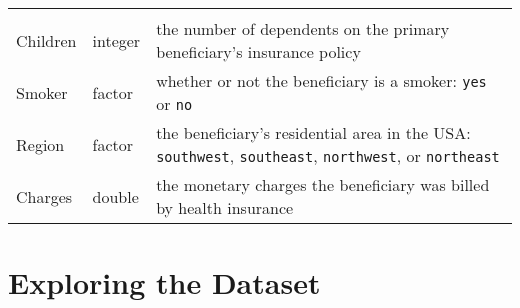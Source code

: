 \documentclass[
]{article}
\begin{document}
\begin{longtable}[]{@{}lll@{}}
\begin{minipage}[t]{0.46\columnwidth}
\end{minipage}\tabularnewline
\begin{minipage}[t]{0.27\columnwidth}\raggedright
Children\strut
\end{minipage} & \begin{minipage}[t]{0.18\columnwidth}\raggedright
integer\strut
\end{minipage} & \begin{minipage}[t]{0.46\columnwidth}\raggedright
the number of dependents on the primary beneficiary's insurance policy\strut
\end{minipage}\tabularnewline
\begin{minipage}[t]{0.27\columnwidth}\raggedright
Smoker\strut
\end{minipage} & \begin{minipage}[t]{0.18\columnwidth}\raggedright
factor\strut
\end{minipage} & \begin{minipage}[t]{0.46\columnwidth}\raggedright
whether or not the beneficiary is a smoker: \texttt{yes} or \texttt{no}\strut
\end{minipage}\tabularnewline
\begin{minipage}[t]{0.27\columnwidth}\raggedright
Region\strut
\end{minipage} & \begin{minipage}[t]{0.18\columnwidth}\raggedright
factor\strut
\end{minipage} & \begin{minipage}[t]{0.46\columnwidth}\raggedright
the beneficiary's residential area in the USA: \texttt{southwest}, \texttt{southeast}, \texttt{northwest}, or \texttt{northeast}\strut
\end{minipage}\tabularnewline
\begin{minipage}[t]{0.27\columnwidth}\raggedright
Charges\strut
\end{minipage} & \begin{minipage}[t]{0.18\columnwidth}\raggedright
double\strut
\end{minipage} & \begin{minipage}[t]{0.46\columnwidth}\raggedright
the monetary charges the beneficiary was billed by health insurance\strut
\end{minipage}\tabularnewline
\bottomrule
\end{longtable}

\hypertarget{exploring-the-dataset}{%
\section{Exploring the Dataset}\label{exploring-the-dataset}}
\end{document}
